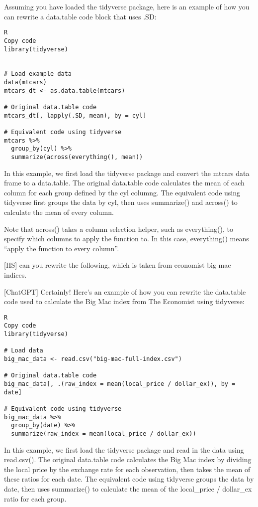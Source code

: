 \documentclass[
]{book}
\theoremstyle{definition}
\theoremstyle{definition}
\theoremstyle{definition}
\theoremstyle{definition}
\theoremstyle{remark}
\begin{document}
Assuming you have loaded the tidyverse package, here is an example of how you can rewrite a data.table code block that uses .SD:

\begin{verbatim}
R
Copy code
library(tidyverse)


# Load example data
data(mtcars)
mtcars_dt <- as.data.table(mtcars)

# Original data.table code
mtcars_dt[, lapply(.SD, mean), by = cyl]

# Equivalent code using tidyverse
mtcars %>%
  group_by(cyl) %>%
  summarize(across(everything(), mean))
\end{verbatim}

In this example, we first load the tidyverse package and convert the mtcars data frame to a data.table. The original data.table code calculates the mean of each column for each group defined by the cyl columng. The equivalent code using tidyverse first groups the data by cyl, then uses summarize() and across() to calculate the mean of every column.

Note that across() takes a column selection helper, such as everything(), to specify which columns to apply the function to. In this case, everything() means ``apply the function to every column''.

{[}HS{]} can you rewrite the following, which is taken from economist big mac indices.

{[}ChatGPT{]} Certainly! Here's an example of how you can rewrite the data.table code used to calculate the Big Mac index from The Economist using tidyverse:

\begin{verbatim}
R
Copy code
library(tidyverse)

# Load data
big_mac_data <- read.csv("big-mac-full-index.csv")

# Original data.table code
big_mac_data[, .(raw_index = mean(local_price / dollar_ex)), by = date]

# Equivalent code using tidyverse
big_mac_data %>%
  group_by(date) %>%
  summarize(raw_index = mean(local_price / dollar_ex))
\end{verbatim}

In this example, we first load the tidyverse package and read in the data using read.csv(). The original data.table code calculates the Big Mac index by dividing the local price by the exchange rate for each observation, then takes the mean of these ratios for each date. The equivalent code using tidyverse groups the data by date, then uses summarize() to calculate the mean of the local\_price / dollar\_ex ratio for each group.
\end{document}
